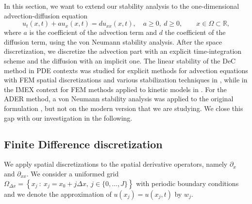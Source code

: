 In this section, we want to extend our stability analysis to the one-dimensional advection-diffusion equation
\begin{equation}\label{eq: A-D_equation}
u_t(x,t) + au_x(x,t) = du_{xx}(x,t), \quad a\ge0, \ d \ge 0, \qquad x \in \Omega \subset \mathbb R,
\end{equation}
where $a$ is the coefficient of the advection term and $d$ the coefficient of the diffusion term, using the von  Neumann stability analysis. %
After the space discretization, we discretize the advection part with an explicit time-integration scheme and the diffusion with an implicit one.
The linear stability of the DeC method in PDE contexts was studied for explicit methods for advection equations with FEM spatial discretizations and various stabilization techniques in \cite{michel2021spectral,michel2023spectral}, while in the IMEX context for FEM methods applied to kinetic models in \cite{torlo2020hyperbolic}.
For the ADER method, a von Neumann stability analysis was applied to the original formulation \cite{titarev2007analysis,dematte2020ader}, but not on the modern version that we are studying. We close this gap with our investigation in the following.
\subsection{Finite Difference discretization}
\label{sec: spatial_discretization}
We apply spatial discretizations to the spatial derivative operators, namely $\partial_x$ and $\partial_{xx}$. 
We consider a uniformed grid $\Omega_{\Delta x}=\left\{x_j \ : \ x_j = x_0 + j\Delta x, \ j \in \{0,\hdots , J\}\right\}$ with periodic boundary conditions and we denote the approximation of $u(x_j)=u(x_j,t)$ by $w_j$.

